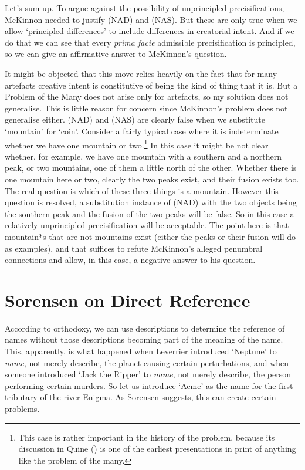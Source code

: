 \documentclass[
  10pt,
  letterpaper,
  DIV=11,
  numbers=noendperiod,
  twoside]{scrartcl}
\begin{document}
Let's sum up. To argue against the possibility of unprincipled
precisifications, McKinnon needed to justify (NAD) and (NAS). But these
are only true when we allow `principled differences' to include
differences in creatorial intent. And if we do that we can see that
every \emph{prima facie} admissible precisification is principled, so we
can give an affirmative answer to McKinnon's question.

It might be objected that this move relies heavily on the fact that for
many artefacts creative intent is constitutive of being the kind of
thing that it is. But a Problem of the Many does not arise only for
artefacts, so my solution does not generalise. This is little reason for
concern since McKinnon's problem does not generalise either. (NAD) and
(NAS) are clearly false when we substitute `mountain' for `coin'.
Consider a fairly typical case where it is indeterminate whether we have
one mountain or two.\footnote{This case is rather important in the
  history of the problem, because its discussion in Quine
  () is one of the earliest presentations
  in print of anything like the problem of the many.} In this case it
might be not clear whether, for example, we have one mountain with a
southern and a northern peak, or two mountains, one of them a little
north of the other. Whether there is one mountain here or two, clearly
the two peaks exist, and their fusion exists too. The real question is
which of these three things is a mountain. However this question is
resolved, a substitution instance of (NAD) with the two objects being
the southern peak and the fusion of the two peaks will be false. So in
this case a relatively unprincipled precisification will be acceptable.
The point here is that mountain*s that are not mountains exist (either
the peaks or their fusion will do as examples), and that suffices to
refute McKinnon's alleged penumbral connections and allow, in this case,
a negative answer to his question.

\section{Sorensen on Direct
Reference}\label{sorensen-on-direct-reference}

According to orthodoxy, we can use descriptions to determine the
reference of names without those descriptions becoming part of the
meaning of the name. This, apparently, is what happened when Leverrier
introduced `Neptune' to \emph{name}, not merely describe, the planet
causing certain perturbations, and when someone introduced `Jack the
Ripper' to \emph{name}, not merely describe, the person performing
certain murders. So let us introduce `Acme' as the name for the first
tributary of the river Enigma. As Sorensen suggests, this can create
certain problems.
\end{document}
